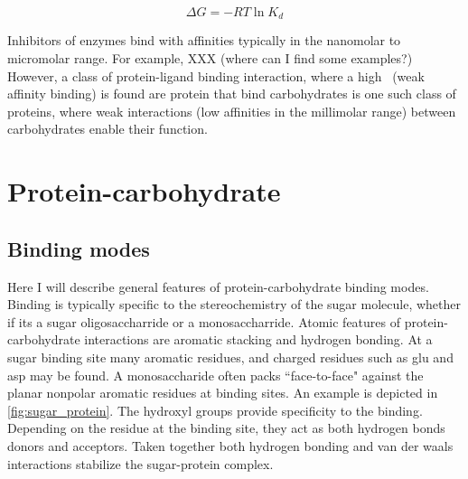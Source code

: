      \begin{equation}
        \Delta G = -RT\ln K_d
     \end{equation}
     

Inhibitors of enzymes bind with affinities typically in the nanomolar to micromolar range.  For example, XXX (where can I find some examples?) However, a class of protein-ligand binding interaction, where a high \KD\ (weak affinity binding) is found are protein that bind carbohydrates is one such class of proteins, where weak interactions (low affinities in the millimolar range) between carbohydrates enable their function.

\section{Protein-carbohydrate}

\subsection{Binding modes}
Here I will describe general features of protein-carbohydrate binding modes. Binding is typically specific to the stereochemistry of the sugar molecule, whether if its a sugar oligosaccharride or a monosaccharride. Atomic features of protein-carbohydrate interactions are aromatic stacking and hydrogen bonding.\cite{Vyas:1991p6498}  At a sugar binding site many aromatic residues, and charged residues such as glu and asp may be found. A monosaccharide often packs ``face-to-face" against the planar nonpolar aromatic residues at binding sites.  An example is depicted in \ref{fig:sugar_protein}.  The hydroxyl groups provide specificity to the binding.  Depending on the residue at the binding site, they act as both hydrogen bonds donors and acceptors. Taken together both hydrogen bonding and van der waals interactions stabilize the sugar-protein complex.

